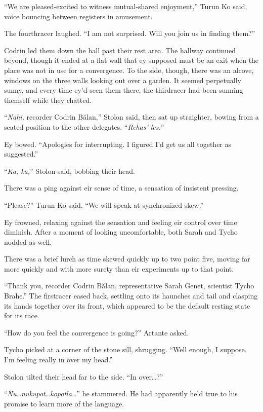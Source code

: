 ``We are pleased-excited to witness mutual-shared enjoyment,'' Turun Ko said, voice bouncing between registers in amusement.

The fourthracer laughed. ``I am not surprised. Will you join us in finding them?''

Codrin led them down the hall past their rest area. The hallway continued beyond, though it ended at a flat wall that ey supposed must be an exit when the place was not in use for a convergence. To the side, though, there was an alcove, windows on the three walls looking out over a garden. It seemed perpetually sunny, and every time ey'd seen them there, the thirdracer had been sunning themself while they chatted.

``\emph{Nahi,} recorder Codrin Bălan,'' Stolon said, then sat up straighter, bowing from a seated position to the other delegates. ``\emph{Rehas' les.}''

Ey bowed. ``Apologies for interrupting. I figured I'd get us all together as suggested.''

``\emph{Ka, ka,}'' Stolon said, bobbing their head.

There was a ping against eir sense of time, a sensation of insistent pressing.

``Please?'' Turun Ko said. ``We will speak at synchronized skew.''

Ey frowned, relaxing against the sensation and feeling eir control over time diminish. After a moment of looking uncomfortable, both Sarah and Tycho nodded as well.

There was a brief lurch as time skewed quickly up to two point five, moving far more quickly and with more surety than eir experiments up to that point.

``Thank you, recorder Codrin Bălan, representative Sarah Genet, scientist Tycho Brahe.'' The firstracer eased back, settling onto its haunches and tail and clasping its hands together over its front, which appeared to be the default resting state for its race.

``How do you feel the convergence is going?'' Artante asked.

Tycho picked at a corner of the stone sill, shrugging. ``Well enough, I suppose. I'm feeling really in over my head.''

Stolon tilted their head far to the side. ``In over\ldots?''

``\emph{Nu\ldots nukupot\ldots kopotla\ldots{}}'' he stammered. He had apparently held true to his promise to learn more of the language.

